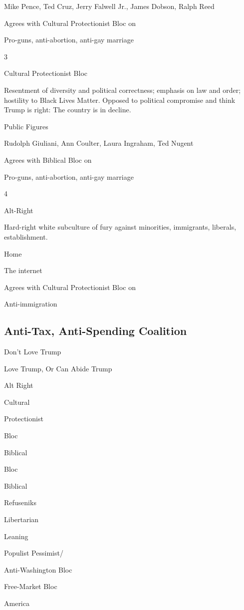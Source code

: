 Mike Pence, Ted Cruz, Jerry Falwell Jr., James Dobson, Ralph Reed

Agrees with Cultural Protectionist Bloc on

Pro-guns, anti-abortion, anti-gay marriage

3

Cultural Protectionist Bloc

Resentment of diversity and political correctness; emphasis on law and
order; hostility to Black Lives Matter. Opposed to political compromise
and think Trump is right: The country is in decline.

Public Figures

Rudolph Giuliani, Ann Coulter, Laura Ingraham, Ted Nugent

Agrees with Biblical Bloc on

Pro-guns, anti-abortion, anti-gay marriage

4

Alt-Right

Hard-right white subculture of fury against minorities, immigrants,
liberals, establishment.

Home

The internet

Agrees with Cultural Protectionist Bloc on

Anti-immigration

\hypertarget{anti-tax-anti-spending-coalition}{%
\subsection{Anti-Tax, Anti-Spending
Coalition}\label{anti-tax-anti-spending-coalition}}

Don't Love Trump

Love Trump, Or Can Abide Trump

Alt Right

Cultural

Protectionist

Bloc

Biblical

Bloc

Biblical

Refuseniks

Libertarian

Leaning

Populist Pessimist/

Anti-Washington Bloc

Free-Market Bloc

America

